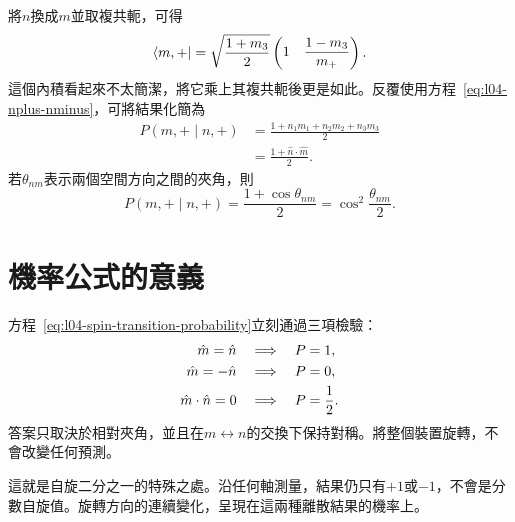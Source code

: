 將\(n\)換成\(m\)並取複共軛，可得
\begin{equation}
  \left\langle m,+\right\rvert
  =
  \sqrt{\frac{1+m_3}{2}}
  \begin{pmatrix}
    1&
    \dfrac{1-m_3}{m_+}
  \end{pmatrix}.
\end{equation}
這個內積看起來不太簡潔，將它乘上其複共軛後更是如此。反覆使用方程~\eqref{eq:l04-nplus-nminus}，可將結果化簡為
\begin{equation}
  \begin{aligned}
    P(m,+\mid n,+)
    &=\frac{1+n_1m_1+n_2m_2+n_3m_3}{2}\\
    &=\frac{1+\hat n\cdot\hat m}{2}.
  \end{aligned}
  \label{eq:l04-spin-transition-probability}
\end{equation}
若\(\theta_{nm}\)表示兩個空間方向之間的夾角，則
\begin{equation}
  P(m,+\mid n,+)
  =
  \frac{1+\cos\theta_{nm}}{2}
  =
  \cos^2\frac{\theta_{nm}}{2}.
  \label{eq:l04-half-angle-probability}
\end{equation}

\begin{classroomqa}
\end{classroomqa}

\section{機率公式的意義}

方程~\eqref{eq:l04-spin-transition-probability}立刻通過三項檢驗：
\begin{align}
  \hat m=\hat n
  &\quad\Longrightarrow\quad P=1,
  \notag\\
  \hat m=-\hat n
  &\quad\Longrightarrow\quad P=0,
  \notag\\
  \hat m\cdot\hat n=0
  &\quad\Longrightarrow\quad P=\frac12.
\end{align}
答案只取決於相對夾角，並且在\(m\leftrightarrow n\)的交換下保持對稱。將整個裝置旋轉，不會改變任何預測。

這就是自旋二分之一的特殊之處。沿任何軸測量，結果仍只有\(+1\)或\(-1\)，不會是分數自旋值。旋轉方向的連續變化，呈現在這兩種離散結果的機率上。

